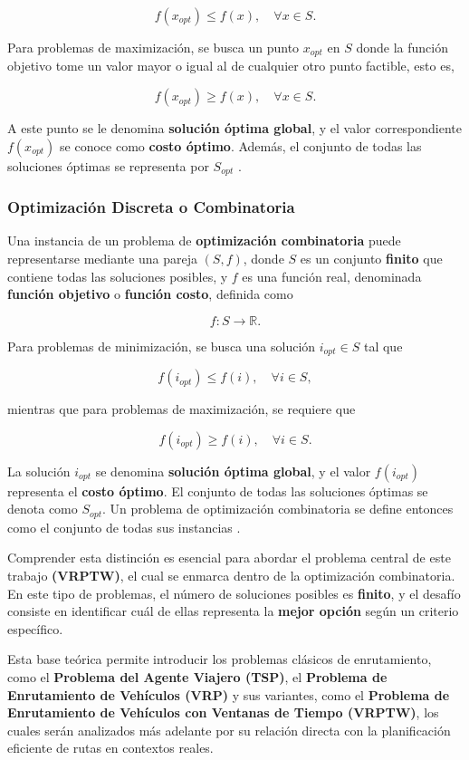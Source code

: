 \documentclass[12pt,titlepage,twoside,openright]{book}
\begin{document}
\[
	f(x_{opt}) \leq f(x), \quad \forall x \in S.
\]

Para problemas de maximización, se busca un punto \( x_{opt} \) en \( S \) donde la función objetivo tome un valor mayor o igual al de cualquier otro punto factible, esto es,

\[
	f(x_{opt}) \geq f(x), \quad \forall x \in S.
\]

A este punto se le denomina \textbf{solución óptima global}, y el valor correspondiente \( f(x_{opt}) \) se conoce como \textbf{costo óptimo}. Además, el conjunto de todas las soluciones óptimas se representa por \( S_{opt} \) \citep{cobos2010}.


\subsubsection{Optimización Discreta o Combinatoria}
\label{subsec:opt_discreta}

Una instancia de un problema de \textbf{optimización combinatoria} puede representarse mediante una pareja \((S, f)\), donde \(S\) es un conjunto \textbf{finito} que contiene todas las soluciones posibles, y \(f\) es una función real, denominada \textbf{función objetivo} o \textbf{función costo}, definida como

\[
	f: S \to \mathbb{R}.
\]

Para problemas de minimización, se busca una solución \(i_{opt} \in S\) tal que

\[
	f(i_{opt}) \leq f(i), \quad \forall i \in S,
\]

mientras que para problemas de maximización, se requiere que

\[
	f(i_{opt}) \geq f(i), \quad \forall i \in S.
\]

La solución \(i_{opt}\) se denomina \textbf{solución óptima global}, y el valor \(f(i_{opt})\) representa el \textbf{costo óptimo}. El conjunto de todas las soluciones óptimas se denota como \(S_{opt}\). Un problema de optimización combinatoria se define entonces como el conjunto de todas sus instancias \citep{cobos2010}.

Comprender esta distinción es esencial para abordar el problema central de este trabajo \textbf{(VRPTW)}, el cual se enmarca dentro de la optimización combinatoria. En este tipo de problemas, el número de soluciones posibles es \textbf{finito}, y el desafío consiste en identificar cuál de ellas representa la \textbf{mejor opción} según un criterio específico.

Esta base teórica permite introducir los problemas clásicos de enrutamiento, como el \textbf{Problema del Agente Viajero (TSP)}, el \textbf{Problema de Enrutamiento de Vehículos (VRP)} y sus variantes, como el \textbf{Problema de Enrutamiento de Vehículos con Ventanas de Tiempo (VRPTW)}, los cuales serán analizados más adelante por su relación directa con la planificación eficiente de rutas en contextos reales.
\end{document}
